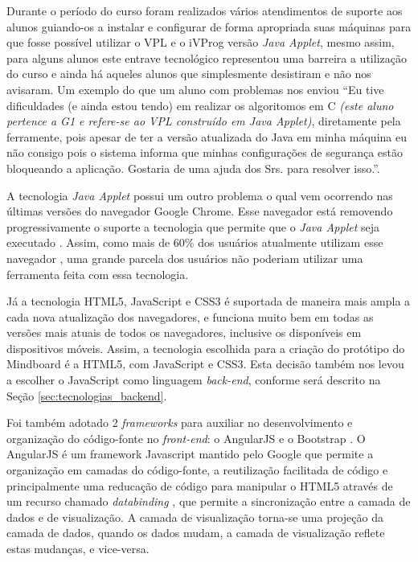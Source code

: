 Durante o período do curso foram realizados vários atendimentos de suporte aos alunos guiando-os a instalar e configurar de forma apropriada suas máquinas para que fosse possível utilizar o VPL e o iVProg versão \emph{Java Applet}, mesmo assim, para alguns alunos este entrave tecnológico representou uma barreira a utilização do curso e ainda há aqueles alunos que simplesmente desistiram e não nos avisaram. Um exemplo do que um aluno com problemas nos enviou ``Eu tive dificuldades (e ainda estou tendo) em realizar os algoritomos em C \emph{(este aluno pertence a G1 e refere-se ao VPL construído em Java Applet)}, diretamente pela ferramente, pois apesar de ter a versão atualizada do Java em minha máquina eu não consigo pois o sistema informa que minhas configurações de segurança estão bloqueando a aplicação. Gostaria de uma ajuda dos Srs. para resolver isso.''. 

A tecnologia \emph{Java Applet} possui um outro problema o qual vem ocorrendo nas últimas versões do navegador Google Chrome. Esse navegador está removendo progressivamente o suporte a tecnologia que permite que o \emph{Java Applet} seja executado \cite{java_chrome}. Assim, como mais de 60\% dos usuários atualmente utilizam esse navegador \cite{browser_stats}, uma grande parcela dos usuários não poderiam utilizar uma ferramenta feita com essa tecnologia.

Já a tecnologia HTML5, JavaScript e CSS3 é suportada de maneira mais ampla a cada nova atualização dos navegadores, e funciona muito bem em todas as versões mais atuais de todos os navegadores, inclusive os disponíveis em dispositivos móveis. Assim, a tecnologia escolhida para a criação do protótipo do Mindboard é a HTML5, com JavaScript e CSS3. Esta decisão também nos levou a escolher o JavaScript como linguagem \emph{back-end}, conforme será descrito na Seção \ref{sec:tecnologias_backend}.

Foi também adotado 2 \emph{frameworks} para auxiliar no desenvolvimento e organização do código-fonte no \emph{front-end}: o AngularJS \cite{angularjs} e o Bootstrap \cite{getbootstrap}. O AngularJS é um framework Javascript mantido pelo Google que permite a organização em camadas do código-fonte, a reutilização facilitada de código e principalmente uma reducação de código para manipular o HTML5 através de um recurso chamado \emph{databinding} \cite{databinding}, que permite a sincronização entre a camada de dados e de visualização. A camada de visualização torna-se uma projeção da camada de dados, quando os dados mudam, a camada de visualização reflete estas mudanças, e vice-versa.

